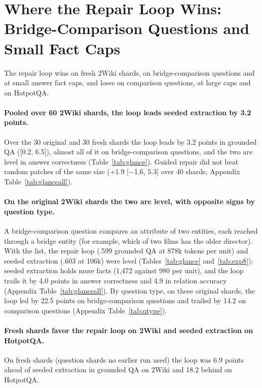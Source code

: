 \section{Where the Repair Loop Wins: Bridge-Comparison Questions and Small Fact Caps}
\label{sec:res-loop}

The repair loop wins on fresh 2Wiki shards, on bridge-comparison questions and at small answer fact caps, and loses on comparison questions, at large caps and on HotpotQA.

\paragraph{Pooled over 60 2Wiki shards, the loop leads seeded extraction by 3.2 points.}
Over the 30 original and 30 fresh shards the loop leads by 3.2 points in grounded QA ([0.2, 6.5]), almost all of it on bridge-comparison questions, and the two are level in answer correctness (Table~\ref{tab:glance}). Guided repair did not beat random patches of the same size (+1.9 [$-$1.6, 5.3] over 40 shards; Appendix Table~\ref{tab:glanceall}).

\paragraph{On the original 2Wiki shards the two are level, with opposite signs by question type.}
A bridge-comparison question compares an attribute of two entities, each reached through a bridge entity (for example, which of two films has the older director). With the list, the repair loop (.599 grounded QA at 878k tokens per unit) and seeded extraction (.603 at 106k) were level (Tables~\ref{tab:glance} and~\ref{tab:exp8}); seeded extraction holds more facts (1,472 against 980 per unit), and the loop trails it by 4.0 points in answer correctness and 4.9 in relation accuracy (Appendix Table~\ref{tab:glanceall}). By question type, on these original shards, the loop led by 22.5 points on bridge-comparison questions and trailed by 14.2 on comparison questions (Appendix Table~\ref{tab:qtype}).

\paragraph{Fresh shards favor the repair loop on 2Wiki and seeded extraction on HotpotQA.}
On fresh shards (question shards no earlier run used) the loop was 6.9 points ahead of seeded extraction in grounded QA on 2Wiki and 18.2 behind on HotpotQA.


